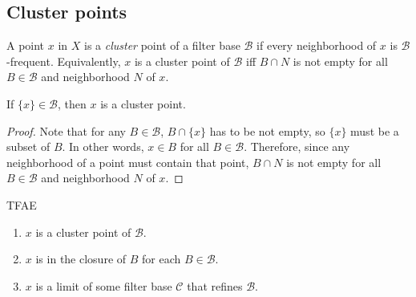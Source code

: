 \documentclass{treatise}
\begin{document}
\subsection{Cluster points}
A point $x$ in $X$ is a \emph{cluster} point of a filter base $\mathcal{B}$ if every neighborhood of $x$ is $\mathcal{B}$-frequent. Equivalently, $x$ is a cluster point of $\mathcal{B}$ iff $B \cap N$ is not empty for all $B \in \mathcal{B}$ and neighborhood $N$ of $x$.
\begin{remark}
If $\{ x \} \in \mathcal{B}$, then $x$ is a cluster point.
\end{remark}
\begin{proof}
Note that for any $B \in \mathcal{B}$, $B \cap \{ x \}$ has to be not empty, so $\{ x \}$ must be a subset of $B$. In other words, $x \in B$ for all $B \in \mathcal{B}$. Therefore, since any neighborhood of a point must contain that point, $B \cap N$ is not empty for all $B \in \mathcal{B}$ and neighborhood $N$ of $x$.
\end{proof}
\begin{proposition} \label{topo-cluster-equiv}
TFAE
\begin{enumerate}
    \item $x$ is a cluster point of $\mathcal{B}$.
    \item $x$ is in the closure of $B$ for each $B \in \mathcal{B}$.
    \item $x$ is a limit of some filter base $\mathcal{C}$ that refines $\mathcal{B}$.
\end{enumerate}
\end{proposition}
\end{document}
